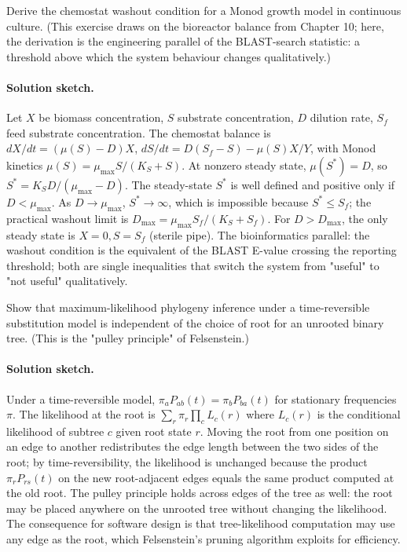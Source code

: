 \begin{exercise}
Derive the chemostat washout condition for a Monod growth model in
continuous culture. (This exercise draws on the bioreactor balance
from Chapter 10; here, the derivation is the engineering parallel of
the BLAST-search statistic: a threshold above which the system
behaviour changes qualitatively.)

\paragraph{Solution sketch.}
Let $X$ be biomass concentration, $S$ substrate concentration, $D$
dilution rate, $S_{f}$ feed substrate concentration. The chemostat
balance is $dX/dt = (\mu(S) - D) X$, $dS/dt = D(S_{f} - S) -
\mu(S) X / Y$, with Monod kinetics $\mu(S) = \mu_{\max} S/(K_{S} +
S)$. At nonzero steady state, $\mu(S^{\ast}) = D$, so $S^{\ast} =
K_{S} D / (\mu_{\max} - D)$. The steady-state $S^{\ast}$ is well
defined and positive only if $D < \mu_{\max}$. As $D \to \mu_{\max}$,
$S^{\ast} \to \infty$, which is impossible because $S^{\ast} \leq
S_{f}$; the practical washout limit is $D_{\max} = \mu_{\max} S_{f}
/ (K_{S} + S_{f})$. For $D > D_{\max}$, the only steady state is
$X = 0, S = S_{f}$ (sterile pipe). The bioinformatics parallel: the
washout condition is the equivalent of the BLAST E-value crossing the
reporting threshold; both are single inequalities that switch the
system from "useful" to "not useful" qualitatively.
\end{exercise}

\begin{exercise}
Show that maximum-likelihood phylogeny inference under a time-reversible
substitution model is independent of the choice of root for an unrooted
binary tree. (This is the "pulley principle" of Felsenstein.)

\paragraph{Solution sketch.}
Under a time-reversible model, $\pi_{a} P_{ab}(t) = \pi_{b} P_{ba}(t)$
for stationary frequencies $\pi$. The likelihood at the root is
$\sum_{r} \pi_{r} \prod_{c} L_{c}(r)$ where $L_{c}(r)$ is the
conditional likelihood of subtree $c$ given root state $r$. Moving the
root from one position on an edge to another redistributes the edge
length between the two sides of the root; by time-reversibility, the
likelihood is unchanged because the product $\pi_{r} P_{rs}(t)$ on the
new root-adjacent edges equals the same product computed at the old
root. The pulley principle holds across edges of the tree as well: the
root may be placed anywhere on the unrooted tree without changing the
likelihood. The consequence for software design is that tree-likelihood
computation may use any edge as the root, which Felsenstein's pruning
algorithm exploits for efficiency.
\end{exercise}

